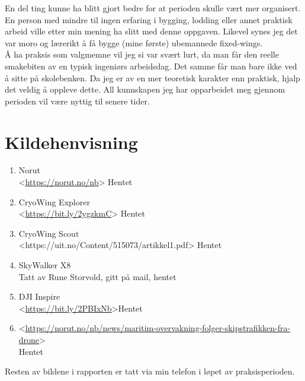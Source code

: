 \documentclass[12pt, a4paper]{article}
\begin{document}
En del ting kunne ha blitt gjort bedre for at perioden skulle vært mer organisert. En person med mindre til ingen erfaring i bygging, lodding eller annet praktisk arbeid ville etter min mening ha slitt med denne oppgaven. Likevel synes jeg det var moro og lærerikt å få bygge (mine første) ubemannede fixed-wings. \\

Å ha praksis som valgmemne vil jeg si var svært lurt, da man får den reelle smakebiten av en typisk ingeniørs arbeidsdag. Det samme får man bare ikke ved å sitte på skolebenken. Da jeg er av en mer teoretisk karakter enn praktisk, hjalp det veldig å oppleve dette. All kunnskapen jeg har opparbeidet meg gjennom perioden vil være nyttig til senere tider. 

\clearpage

\section{Kildehenvisning}
\begin{enumerate}
	\item Norut\\
		<\url{https://norut.no/nb}> Hentet \\
	\item CryoWing Explorer\\
		<\url{https://bit.ly/2ygzkmC}> Hentet \\
	\item CryoWing Scout \\
		<https://uit.no/Content/515073/artikkel1.pdf> Hentet \\
	\item SkyWalker X8 \\
		Tatt av Rune Storvold, gitt på mail, hentet \\
	\item DJI Inspire \\
		<\url{https://bit.ly/2PBIxNb}>Hentet \\
	\item <\url{https://norut.no/nb/news/maritim-overvakning-folger-skipstrafikken-fra-drone}> \\ Hentet \\

\end{enumerate}

Resten av bildene i rapporten er tatt via min telefon i løpet av praksisperioden.\\
\end{document}
